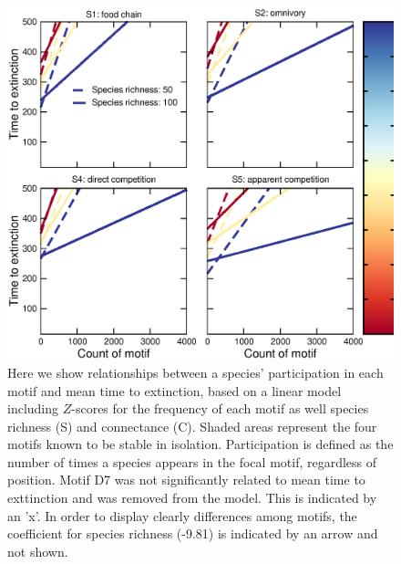 \documentclass[12pt]{article}
\begin{document}
	\begin{figure}[h!]
		\caption{Here we show relationships between a species' participation in each motif and mean time to extinction, based on a linear model including $Z$-scores for the frequency of each motif as well species richness (S) and connectance (C). Shaded areas represent the four motifs known to be stable in isolation. Participation is defined as the number of times a species appears in the focal motif, regardless of position. Motif D7 was not significantly related to mean time to exttinction and was removed from the model. This is indicated by an 'x'. In order to display clearly differences among motifs, the coefficient for species richness (-9.81) is indicated by an arrow and not shown.}
		\label{motif_coefs}
		\includegraphics[width=\textwidth]{figures/extinction_order/motif_lmer_summary_paper_full.eps}
		\end{figure}




\end{document}
